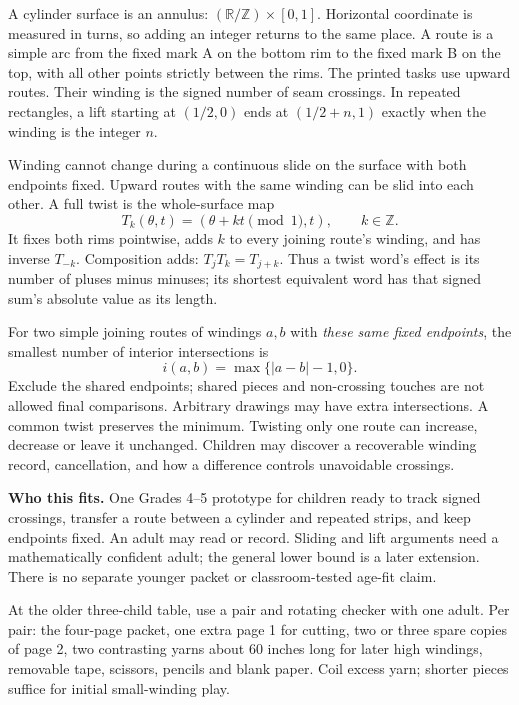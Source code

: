 \documentclass[11pt,letterpaper]{article}
\newcommand{\sect}[1]{\par\vspace{5pt}{\large\bfseries #1}\par}
\begin{document}
\sect{The mathematics first}
A cylinder surface is an annulus: $(\mathbb R/\mathbb Z)\times[0,1]$.
Horizontal coordinate is measured in turns, so adding an integer returns to the
same place. A route is a simple arc from the fixed mark A on the bottom rim to
the fixed mark B on the top, with all other points strictly between the rims.
The printed tasks use upward routes. Their winding is the signed number of seam
crossings. In repeated rectangles, a lift starting at $(1/2,0)$ ends at
$(1/2+n,1)$ exactly when the winding is the integer $n$.

Winding cannot change during a continuous slide on the surface with both
endpoints fixed. Upward routes with the same winding can be slid into each other.
A full twist is the whole-surface map
\[
 T_k(\theta,t)=(\theta+kt\pmod1,t),\qquad k\in\mathbb Z.
\]
It fixes both rims pointwise, adds $k$ to every joining route's winding, and has
inverse $T_{-k}$. Composition adds: $T_jT_k=T_{j+k}$. Thus a twist word's effect
is its number of pluses minus minuses; its shortest equivalent word has that
signed sum's absolute value as its length.

For two simple joining routes of windings $a,b$ with \emph{these same fixed
endpoints}, the smallest number of interior intersections is
\[
 i(a,b)=\max\{|a-b|-1,0\}.
\]
Exclude the shared endpoints; shared pieces and non-crossing touches are not
allowed final comparisons. Arbitrary drawings may have extra intersections.
A common twist preserves the minimum. Twisting only one route can increase,
decrease or leave it unchanged. Children may discover a recoverable winding
record, cancellation, and how a difference controls unavoidable crossings.

\textbf{Who this fits.} One Grades 4--5 prototype for children ready to track
signed crossings, transfer a route between a cylinder and repeated strips, and
keep endpoints fixed. An adult may read or record. Sliding and lift arguments
need a mathematically confident adult; the general lower bound is a later
extension. There is no separate younger packet or classroom-tested age-fit claim.

\sect{Materials and preparation}
At the older three-child table, use a pair and rotating checker with one adult.
Per pair: the four-page packet, one extra page 1 for cutting, two or three spare
copies of page 2, two contrasting yarns about $60$ inches long for later high
windings, removable tape, scissors, pencils and blank paper. Coil excess yarn;
shorter pieces suffice for initial small-winding play.
\end{document}
